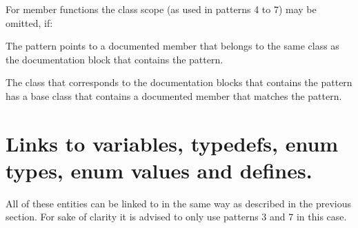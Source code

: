 For member functions the class scope (as used in patterns 4 to 7) may be omitted, if: 
\begin{DoxyEnumerate}
\item The pattern points to a documented member that belongs to the same class as the documentation block that contains the pattern. 
\item The class that corresponds to the documentation blocks that contains the pattern has a base class that contains a documented member that matches the pattern. 
\end{DoxyEnumerate}\hypertarget{autolink_linkother}{}\section{Links to variables, typedefs, enum types, enum values and defines.}\label{autolink_linkother}
All of these entities can be linked to in the same way as described in the previous section. For sake of clarity it is advised to only use patterns 3 and 7 in this case.

